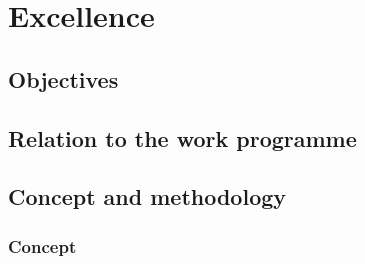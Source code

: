 \chapter{Excellence}



\section{Objectives}



\section{Relation to the work programme}



\section{Concept and methodology}

\subsection{Concept}\label{concept}

  


